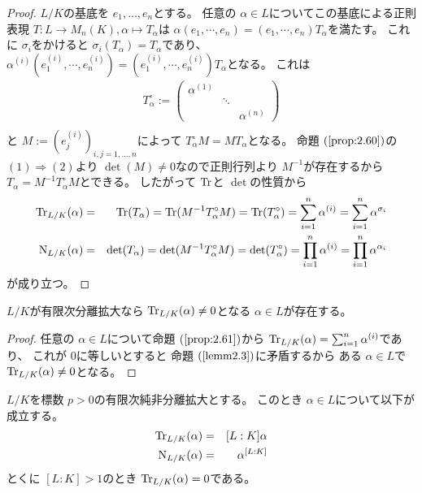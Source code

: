 \documentclass[../master_galois_theory]{subfiles}
\begin{document}
\begin{proof}
  $L/K$の基底を $e_1 , \dots , e_n$とする。
  任意の $\alpha \in L$についてこの基底による正則表現
  $T : L \longrightarrow M_n(K) , \alpha \longmapsto T_\alpha$は
  $\alpha (e_1 , \cdots , e_n) = (e_1 , \cdots , e_n) T_\alpha$を満たす。
  これに $\sigma_i$をかけると $\sigma_i(T_\alpha) = T_\alpha$であり、
  $\alpha^{(i)} (e_1^{(i)} , \cdots , e_n^{(i)}) = (e_1^{(i)} , \cdots , e_n^{(i)}) T_\alpha$となる。
  これは
  \begin{eqnarray*}
    T_\alpha^\circ :=
    \begin{pmatrix}
      \alpha^{(1)} &        & \\
                   & \ddots & \\
                   &        & \alpha^{(n)}
    \end{pmatrix}
    \\
  \end{eqnarray*}
  と $M := (e_j^{(i)})_{i , j = 1 , \dots , n}$によって
  $T_\alpha^\circ M = M T_\alpha$となる。
  命題 $(\mathrm{\ref{prop:2.60}})$の $(1) \Rightarrow (2)$より
  $\det(M) \neq 0$なので正則行列より $M^{-1}$が存在するから
  $T_\alpha = M^{-1} T_\alpha^\circ M$とできる。
  したがって $\mathrm{Tr}$と $\det$の性質から
  \begin{eqnarray*}
    \mathrm{Tr}_{L/K}(\alpha) & = & \mathrm{Tr}(T_\alpha) = \mathrm{Tr}(M^{-1} T_\alpha^\circ M) = \mathrm{Tr}(T_\alpha^\circ) = \sum_{i=1}^n \alpha^{(i)} = \sum_{i=1}^n \alpha^{\sigma_i} \\
    \mathrm{N}_{L/K}(\alpha) & = & \det(T_\alpha) = \det(M^{-1} T_\alpha^\circ M) = \det(T_\alpha^\circ) = \prod_{i=1}^n \alpha^{(i)} = \prod_{i=1}^n \alpha^{\alpha_i}
  \end{eqnarray*}
  が成り立つ。
\end{proof}

\begin{corl} \label{corl:bunritracenorm}
  $L/K$が有限次分離拡大なら $\mathrm{Tr}_{L/K}(\alpha) \neq 0$となる $\alpha \in L$が存在する。
\end{corl}

\begin{proof}
  任意の $\alpha \in L$について命題 $(\mathrm{\ref{prop:2.61}})$から
  $\mathrm{Tr}_{L/K}(\alpha) = \sum_{i=1}^n \alpha^{(i)}$であり、
  これが $0$に等しいとすると
  命題 $(\mathrm{\ref{lemm2.3}})$に矛盾するから
  ある $\alpha \in L$で $\mathrm{Tr}_{L/K}(\alpha) \neq 0$となる。
\end{proof}

\begin{lemm} \label{lemm:hibunritracenorm}
  $L/K$を標数 $p > 0$の有限次純非分離拡大とする。
  このとき $\alpha \in L$について以下が成立する。
  \begin{eqnarray*}
    \mathrm{Tr}_{L/K}(\alpha) & = & [L:K]\alpha \\
    \mathrm{N}_{L/K}(\alpha) & = & \alpha^{[L:K]}
  \end{eqnarray*}
  とくに $[L:K] > 1$のとき $\mathrm{Tr}_{L/K}(\alpha) = 0$である。
\end{lemm}
\end{document}
